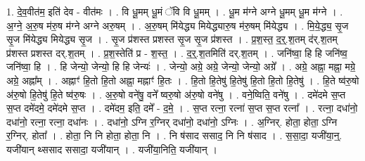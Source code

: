 \documentclass[17pt]{extarticle}
\begin{document}
1. दे॒व॒वीत॑म॒ इति॑ देव - वीत॑मः । . वि धू॒मम् धू॒मं ॅवि वि धू॒मम् । . धू॒म म॑ग्ने अग्ने धू॒मम् धू॒म म॑ग्ने । . अ॒ग्ने॒ अ॒रु॒ष म॑रु॒ष म॑ग्ने अग्ने अरु॒षम् । . अ॒रु॒षम् मि॑येद्ध्य मियेद्ध्यारु॒ष म॑रु॒षम् मि॑येद्ध्य । . मि॒ये॒द्ध्य॒ सृ॒ज सृ॒ज मि॑येद्ध्य मियेद्ध्य सृ॒ज । . सृ॒ज प्र॑शस्त प्रशस्त सृ॒ज सृ॒ज प्र॑शस्त । . प्र॒श॒स्त॒ द॒र्॒.श॒तम् द॑र्.श॒तम् प्र॑शस्त प्रशस्त दर्.श॒तम् । . प्र॒श॒स्तेति॑ प्र - श॒स्त॒ । . द॒र्॒.श॒तमिति॑ दर्.श॒तम् । . जनि॑ष्वा॒ हि हि जनि॑ष्व॒ जनि॑ष्वा॒ हि । . हि जेन्यो॒ जेन्यो॒ हि हि जेन्यः॑ । . जेन्यो॒ अग्रे॒ अग्रे॒ जेन्यो॒ जेन्यो॒ अग्रे᳚ । . अग्रे॒ अह्ना॒ मह्ना॒ मग्रे॒ अग्रे॒ अह्ना᳚म् । . अह्नाꣳ॑ हि॒तो हि॒तो अह्ना॒ मह्नाꣳ॑ हि॒तः । . हि॒तो हि॒तेषु॑ हि॒तेषु॑ हि॒तो हि॒तो हि॒तेषु॑ । . हि॒ते ष्व॑रु॒षो अ॑रु॒षो हि॒तेषु॑ हि॒ते ष्व॑रु॒षः । . अ॒रु॒षो वने॑षु॒ वने᳚ ष्वरु॒षो अ॑रु॒षो वने॑षु । . वने॒ष्विति॒ वने॑षु । . दमे॑दमे स॒प्त स॒प्त दमे॑दमे॒ दमे॑दमे स॒प्त । . दमे॑दम॒ इति॒ दमे᳚ - द॒मे॒ । . स॒प्त रत्ना॒ रत्ना॑ स॒प्त स॒प्त रत्ना᳚ । . रत्ना॒ दधा॑नो॒ दधा॑नो॒ रत्ना॒ रत्ना॒ दधा॑नः । . दधा॑नो॒ ऽग्नि र॒ग्निर् दधा॑नो॒ दधा॑नो॒ ऽग्निः । . अ॒ग्निर्. होता॒ होता॒ ऽग्नि र॒ग्निर्. होता᳚ । . होता॒ नि नि होता॒ होता॒ नि । . नि ष॑साद ससाद॒ नि नि ष॑साद । . स॒सा॒दा॒ यजी॑या॒न्॒. यजी॑यान् थ्ससाद ससादा॒ यजी॑यान् । . यजी॑या॒निति॒ यजी॑यान् । \newline
\end{document}

